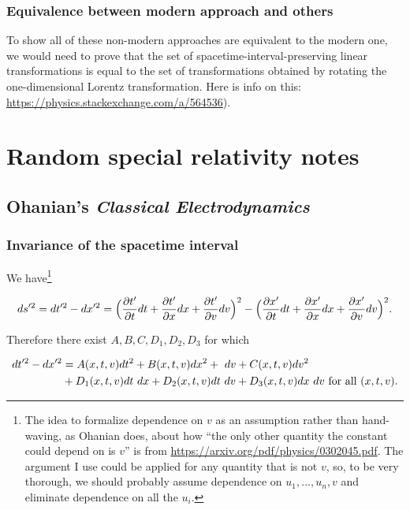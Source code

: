 \documentclass{article}
\begin{document}
\subsubsection*{Equivalence between modern approach and others}

To show all of these non-modern approaches are equivalent to the modern one, we would need to prove that the set of spacetime-interval-preserving linear transformations is equal to the set of transformations obtained by rotating the one-dimensional Lorentz transformation. Here is info on this: \url{https://physics.stackexchange.com/a/564536}).

\newpage

\section*{Random special relativity notes}

\subsection*{Ohanian's \textit{Classical Electrodynamics}}

\subsubsection*{Invariance of the spacetime interval}

We have\footnote{The idea to formalize dependence on $v$ as an assumption rather than hand-waving, as Ohanian does, about how ``the only other quantity the constant could depend on is $v$'' is from \url{https://arxiv.org/pdf/physics/0302045.pdf}. The argument I use could be applied for any quantity that is not $v$, so, to be very thorough, we should probably assume dependence on $u_1, ..., u_n, v$ and eliminate dependence on all the $u_i$.}

\begin{align*}
    ds'^2 = dt'^2 - dx'^2 = \Big( \frac{\partial t'}{\partial t} dt + \frac{\partial t'}{\partial x} dx + \frac{\partial t'}{\partial v} dv \Big)^2 - \Big( \frac{\partial x'}{\partial t} dt + \frac{\partial x'}{\partial x} dx + \frac{\partial x'}{\partial v} dv \Big)^2.
\end{align*}

Therefore there exist $A, B, C, D_1, D_2, D_3$ for which

\begin{align*}
    dt'^2 - dx'^2 &= A(x, t, v) dt^2 + B(x, t, v) dx^2 + \text{ } dv + C(x, t, v) dv^2 \\
    &+ D_1(x, t, v) dt \text{ } dx + D_2(x, t, v) dt \text{ } dv + D_3(x, t, v) dx \text{ } dv
    \text{ for all $(x, t, v)$}.
\end{align*}
\end{document}
